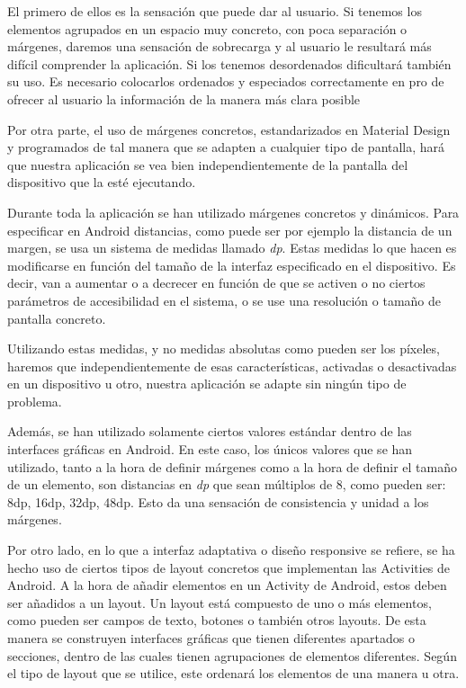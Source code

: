 El primero de ellos es la sensación que puede dar al usuario. Si tenemos los elementos agrupados en un espacio muy concreto, con poca separación o márgenes, daremos una sensación de  sobrecarga y al usuario le resultará más difícil comprender la aplicación. Si los tenemos desordenados dificultará también su uso. Es necesario colocarlos ordenados y especiados correctamente en pro de ofrecer al usuario la información de la manera más clara posible

Por otra parte, el uso de márgenes concretos, estandarizados en Material Design\cite{mat-des-layout} y programados de tal manera que se adapten a cualquier tipo de pantalla, hará que nuestra aplicación se vea bien independientemente de la pantalla del dispositivo que la esté ejecutando.

Durante toda la aplicación se han utilizado márgenes concretos y dinámicos. Para especificar en Android distancias, como puede ser por ejemplo la distancia de un margen, se usa un sistema de medidas llamado \textit{dp}. Estas medidas lo que hacen es modificarse en función del tamaño de la interfaz especificado en el dispositivo. Es decir, van a aumentar o a decrecer en función de que se activen o no ciertos parámetros de accesibilidad en el sistema, o se use una resolución o tamaño de pantalla concreto.

Utilizando estas medidas, y no medidas absolutas como pueden ser los píxeles, haremos que independientemente de esas características, activadas o desactivadas en un dispositivo u otro, nuestra aplicación se adapte sin ningún tipo de problema.

Además, se han utilizado solamente ciertos valores estándar dentro de las interfaces gráficas en Android. En este caso, los únicos valores que se han utilizado, tanto a la hora de definir márgenes como a la hora de definir el tamaño de un elemento, son distancias en \textit{dp} que sean múltiplos de 8, como pueden ser: 8dp, 16dp, 32dp, 48dp. Esto da una sensación de consistencia y unidad a los márgenes.

Por otro lado, en lo que a interfaz adaptativa o diseño responsive se refiere, se ha hecho uso de ciertos tipos de layout concretos que implementan las Activities de Android. A la hora de añadir elementos en un Activity de Android, estos deben ser añadidos a un layout. Un layout está compuesto de uno o más elementos, como pueden ser campos de texto, botones o también otros layouts. De esta manera se construyen interfaces gráficas que tienen diferentes apartados o secciones, dentro de las cuales tienen agrupaciones de elementos diferentes. Según el tipo de layout que se utilice, este ordenará los elementos de una manera u otra.

